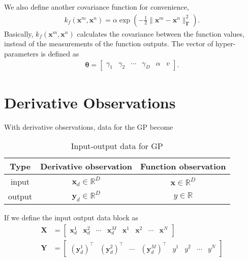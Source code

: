 \documentclass[10pt,oneside,a4paper,notitlepage]{article}
\newcommand{\vect}[1]{\mathbf{#1}}
\begin{document}
We also define another covariance function for convenience,
\begin{align}
k_f(\vect x^m, \vect x^n) = \alpha\exp\left(-\frac{1}{2}\|\vect x^m - \vect x^n\|_{\boldsymbol{\Gamma}}^2\right). 
\end{align}
Basically, $k_f(\vect x^m, \vect x^n)$ calculates the covariance between the function values, instead of the measurements of the function outputs. The vector of hyper-parameters is defined as 
\begin{align}
\boldsymbol\theta = \begin{bmatrix}\gamma_1 & \gamma_2 & \cdots & \gamma_D & \alpha & v\end{bmatrix}.
\end{align}
\section{Derivative Observations}
With derivative observations, data for the GP become
\begin{table}[!h]
\caption{Input-output data for GP }
\centering
\begin{tabular}{ccc}
\hline
Type & Derivative observation & Function observation \\
\hline
input & $\vect x_d\in\mathbb R^D$ & $\vect x\in\mathbb R^D$ \\
output & $\vect y_d\in\mathbb R^D$ & $y\in\mathbb R$\\
\hline
\end{tabular}
\end{table}

If we define the input output data block as 
\begin{align}
\vect X &= \begin{bmatrix}\vect x_d^1 & \vect x_d^2 & \cdots & \vect x_d^M & \vect x^1 & \vect x^2 & \cdots & \vect x^N  \end{bmatrix} \\
\vect Y &= \begin{bmatrix} (\vect y_d^1)^\top &  (\vect y_d^2)^\top & \cdots &  (\vect y_d^M)^\top &  y^1 &  y^2 & \cdots &  y^N  \end{bmatrix}
\end{align}
\end{document}

